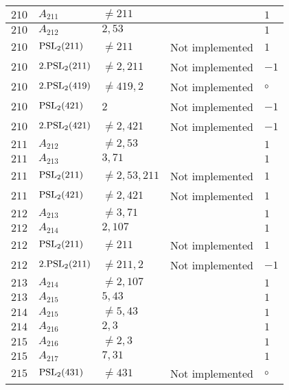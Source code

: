 \documentclass[a4paper, 11pt]{article}
\begin{document}
\begin{longtable}{lllll}
        $ 210 $ & $ A_{211} $ & $ \neq 211 $ & $ ~ $ & $ 1  $ \\ \hline
        $ 210 $ & $ A_{212} $ & $ 2, 53 $ & $ ~ $ & $ 1  $ \\ \hline
        $ 210 $ & $ {\rm PSL}_{2}(211) $ & $ \neq 211 $ & Not implemented & $ 1  $ \\ \hline
        $ 210 $ & $ 2.{\rm PSL}_{2}(211) $ & $ \neq 2, 211 $ & Not implemented & $ -1  $ \\ \hline
        $ 210 $ & $ 2.{\rm PSL}_{2}(419) $ & $ \neq 419, 2 $ & Not implemented & $\circ$ \\ \hline
        $ 210 $ & $ {\rm PSL}_{2}(421) $ & $ 2 $ & Not implemented & $ -1  $ \\ \hline
        $ 210 $ & $ 2.{\rm PSL}_{2}(421) $ & $ \neq 2, 421 $ & Not implemented & $ -1  $ \\ \hline
        $ 211 $ & $ A_{212} $ & $ \neq 2, 53 $ & $ ~ $ & $ 1  $ \\ \hline
        $ 211 $ & $ A_{213} $ & $ 3, 71 $ & $ ~ $ & $ 1  $ \\ \hline
        $ 211 $ & $ {\rm PSL}_{2}(211) $ & $ \neq 2, 53, 211 $ & Not implemented & $ 1  $ \\ \hline
        $ 211 $ & $ {\rm PSL}_{2}(421) $ & $ \neq 2, 421 $ & Not implemented & $ 1  $ \\ \hline
        $ 212 $ & $ A_{213} $ & $ \neq 3, 71 $ & $ ~ $ & $ 1  $ \\ \hline
        $ 212 $ & $ A_{214} $ & $ 2, 107 $ & $ ~ $ & $ 1  $ \\ \hline
        $ 212 $ & $ {\rm PSL}_{2}(211) $ & $ \neq 211 $ & Not implemented & $ 1  $ \\ \hline
        $ 212 $ & $ 2.{\rm PSL}_{2}(211) $ & $ \neq 211, 2 $ & Not implemented & $ -1  $ \\ \hline
        $ 213 $ & $ A_{214} $ & $ \neq 2, 107 $ & $ ~ $ & $ 1  $ \\ \hline
        $ 213 $ & $ A_{215} $ & $ 5, 43 $ & $ ~ $ & $ 1  $ \\ \hline
        $ 214 $ & $ A_{215} $ & $ \neq 5, 43 $ & $ ~ $ & $ 1  $ \\ \hline
        $ 214 $ & $ A_{216} $ & $ 2, 3 $ & $ ~ $ & $ 1  $ \\ \hline
        $ 215 $ & $ A_{216} $ & $ \neq 2, 3 $ & $ ~ $ & $ 1  $ \\ \hline
        $ 215 $ & $ A_{217} $ & $ 7, 31 $ & $ ~ $ & $ 1  $ \\ \hline
        $ 215 $ & $ {\rm PSL}_{2}(431) $ & $ \neq 431 $ & Not implemented & $\circ$ \\ \hline

\end{longtable}
\end{document}
